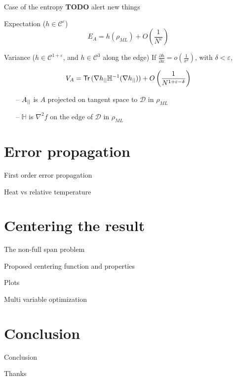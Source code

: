 \documentclass{beamer}
\newcommand{\TODO}{\textbf{TODO}}
\newcommand{\dpar}[2]{\frac{\partial{#1}}{\partial{#2}}}
\newcommand{\Tr}{\mathsf{Tr}\,}
\newcommand{\class}[1]{{\mathscr{C}^{#1}}}
\newcommand{\ml}{_{M\!L}}
\begin{document}
\begin{frame}{Case of the entropy \TODO{} alert new things}


  \begin{block}{Expectation ($h \in \class \varepsilon$)}
    \[E_A = h(\rho\ml) + O \left(\frac 1{N^{\varepsilon}}\right)\]
  \end{block}

  \begin{block}{Variance ($h \in \class{1+\varepsilon}$, and $h \in \class 3$ along the edge)}
    If $\dpar h x = o\left(\frac 1 {x^\delta}\right)$, with $\delta < \varepsilon$,

\vspace{-4mm}

    \[V_A = \Tr(\nabla h\pr \mathbb H\inv(\nabla h\pr)) + O \left(\frac
        1{N^{1+\varepsilon - \delta}}\right)\]

\vspace{-3mm}

    \begin{itemize}
    \item[--] $A_{||}$ is $A$ projected on tangent space to $\mathcal{D}$ in $\rho\ml$
    \item[--] $\mathbb H$ is $\nabla^2f$ on the edge of $\mathcal{D}$ in
      $\rho\ml$
    \end{itemize}
  \end{block}
\end{frame}




\section{Error propagation}

\begin{frame}{First order error propagation}
\end{frame}

\begin{frame}{Heat vs relative temperature}
\end{frame}



\section{Centering the result}

\begin{frame}{The non-full span problem}
\end{frame}

\begin{frame}{Proposed centering function and properties}
\end{frame}

\begin{frame}%
  Plots
\end{frame}

\begin{frame}{Multi variable optimization}
\end{frame}



\section{Conclusion}

\begin{frame}{Conclusion}
\end{frame}

\begin{frame}{Thanks}
\end{frame}
\end{document}
